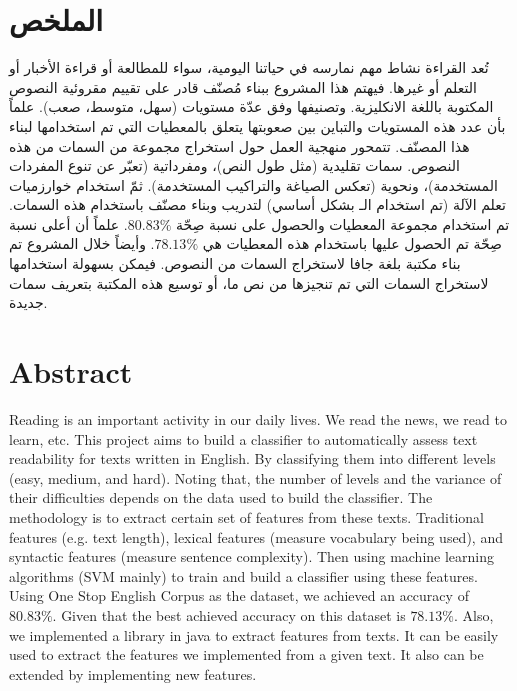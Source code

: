 

\section*{الملخص}
تُعد القراءة نشاط مهم نمارسه في حياتنا اليومية،
سواء للمطالعة أو قراءة الأخبار أو التعلم أو غيرها.
فيهتم هذا المشروع ببناء مُصنّف قادر على تقييم مقروئية النصوص المكتوبة باللغة الانكليزية.
وتصنيفها وفق عدّة مستويات (سهل، متوسط، صعب).
علماً بأن عدد هذه المستويات والتباين بين صعوبتها يتعلق بالمعطيات التي تم استخدامها لبناء هذا المصنّف.
تتمحور منهجية العمل حول استخراج مجموعة من السمات من هذه النصوص.
سمات تقليدية (مثل طول النص)، ومفرداتية (تعبّر عن تنوع المفردات المستخدمة)، ونحوية (تعكس الصياغة والتراكيب المستخدمة).
ثمّ استخدام خوارزميات تعلم الآلة (تم استخدام الـ  بشكل أساسي) لتدريب وبناء مصنّف باستخدام هذه السمات.
تم استخدام مجموعة المعطيات  والحصول على نسبة صِحّة $80.83\%$.
علماً أن أعلى نسبة صِحّة تم الحصول عليها باستخدام هذه المعطيات هي $78.13\%$.
وأيضاً خلال المشروع تم بناء مكتبة بلغة جافا لاستخراج السمات من النصوص.
فيمكن بسهولة استخدامها لاستخراج السمات التي تم تنجيزها من نص ما، أو توسيع هذه المكتبة بتعريف سمات جديدة.


\vfill
{}
\section*{Abstract}

Reading is an important activity in our daily lives.
We read the news, we read to learn, etc.
This project aims to build a classifier to automatically assess text readability for texts written in English.
By classifying them into different levels (easy, medium, and hard).
Noting that, the number of levels and the variance of their difficulties depends on the data used to build the classifier.
The methodology is to extract certain set of features from these texts.
Traditional features (e.g. text length), lexical features (measure vocabulary being used),
and syntactic features (measure sentence complexity).
Then using machine learning algorithms (SVM mainly) to train and build a classifier using these features.
Using One Stop English Corpus as the dataset, we achieved an accuracy of $80.83\%$.
Given that the best achieved accuracy on this dataset is $78.13\%$.
Also, we implemented a library in java to extract features from texts.
It can be easily used to extract the features we implemented from a given text.
It also can be extended by implementing new features.






